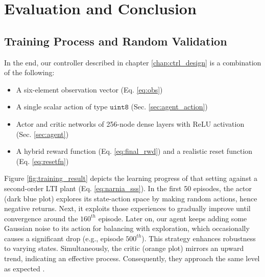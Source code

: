 \documentclass[../main.tex]{subfiles}
\begin{document}
\chapter{Evaluation and Conclusion} \label{chap:eval}

\section{Training Process and Random Validation} \label{sec:train_val}
In the end, our controller described in chapter \ref{chap:ctrl_design} is a combination of the following:
\begin{itemize}
    \item A six-element observation vector (Eq. \ref{eq:obs})
    \item A single scalar action of type $\mathtt{uint8}$ (Sec. \ref{sec:agent_action})
    \item Actor and critic networks of 256-node dense layers with ReLU activation (Sec. \ref{sec:agent})
    \item A hybrid reward function (Eq. \ref{eq:final_rwd}) and a realistic reset function (Eq. \ref{eq:resetfn})
\end{itemize}

Figure \ref{fig:training_result} depicts the learning progress of that setting against a second-order LTI plant (Eq. \ref{eq:narnia_sss}). In the first 50 episodes, the actor (dark blue plot) explores its state-action space by making random actions, hence negative returns. Next, it exploits those experiences to gradually improve until convergence around the $160^{th}$ episode. Later on, our agent keeps adding some Gaussian noise to its action for balancing with exploration, which occasionally causes a significant drop (e.g., episode $500^{th}$). This strategy enhances robustness to varying states. Simultaneously, the critic (orange plot) mirrors an upward trend, indicating an effective process. Consequently, they approach the same level as expected \cite{matlab_q0_support}.
\end{document}
